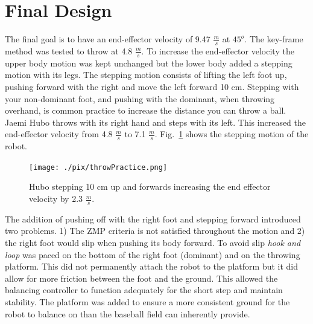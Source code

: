 \section{Final Design}\label{sec:finalDesign}

The final goal is to have an end-effector velocity of 9.47 $\frac{m}{s}$ at $45^o$.  
The key-frame method was tested to throw at 4.8 $\frac{m}{s}$.  
To increase the end-effector velocity the upper body motion was kept unchanged but the lower body added a stepping motion with its legs.
The stepping motion consists of lifting the left foot up, pushing forward with the right and move the left forward 10 cm.  
Stepping with your non-dominant foot, and pushing with the dominant, when throwing overhand, is common practice to increase the distance you can throw a ball.  
Jaemi Hubo throws with its right hand and steps with its left.  
This increased the end-effector velocity from 4.8 $\frac{m}{s}$ to 7.1 $\frac{m}{s}$.
Fig.~\ref{fig:hubo-step} shows the stepping motion of the robot.

\begin{figure}[t]
  \centering
\texttt{[image: ./pix/throwPractice.png]}
  \caption{Hubo stepping 10 cm up and forwards increasing the end effector velocity by 2.3 $\frac{m}{s}$.}
  \label{fig:hubo-step}
\end{figure}

The addition of pushing off with the right foot and stepping forward introduced two problems.  1) The ZMP criteria is not satisfied throughout the motion and 2) the right foot would slip when pushing its body forward.  
To avoid slip \textit{hook and loop} was paced on the bottom of the right foot (dominant) and on the throwing platform.  
This did not permanently attach the robot to the platform but it did allow for more friction between the foot and the ground.
This allowed the balancing controller to function adequately for the short step and maintain stability.
The platform was added to ensure a more consistent ground for the robot to balance on than the baseball field can inherently provide.

